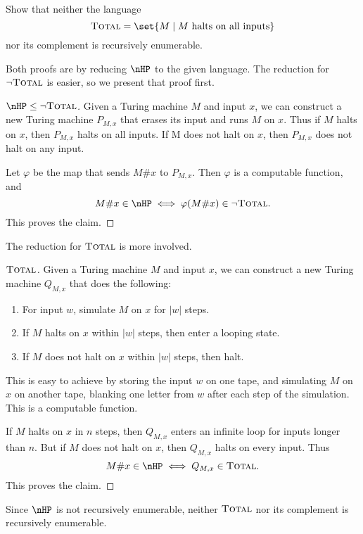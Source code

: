 \documentclass[12pt]{article}
\newcommand{\TOTAL}{\textsc{Total}}
\begin{document}
\begin{problem*}
    Show that neither the language \[
        \TOTAL = \set{M \mid M \text{ halts on all inputs}}
    \] nor its complement is recursively enumerable.
\end{problem*}
\begin{solution}
    Both proofs are by reducing $\nHP$ to the given language.
    The reduction for $\neg \TOTAL$ is easier,
    so we present that proof first.
    \begin{proof}[$\nHP \le \neg \TOTAL$]
        Given a Turing machine $M$ and input $x$, we can construct a new
        Turing machine $P_{M, x}$ that erases its input and runs $M$ on $x$.
        Thus if $M$ halts on $x$, then $P_{M, x}$ halts on all inputs.
        If M does not halt on $x$, then $P_{M, x}$ does not halt on any input.

        Let $\varphi$ be the map that sends $M\#x$ to $P_{M, x}$.
        Then $\varphi$ is a computable function, and \[
            M\#x \in \nHP \iff \varphi(M\#x) \in \neg \TOTAL.
        \] This proves the claim.
    \end{proof}

    The reduction for $\TOTAL$ is more involved.
    \begin{proof}[$\TOTAL$]
        Given a Turing machine $M$ and input $x$, we can construct a new
        Turing machine $Q_{M, x}$ that does the following:
        \begin{enumerate}
            \item For input $w$, simulate $M$ on $x$ for $|w|$ steps.
            \item If $M$ halts on $x$ within $|w|$ steps, then enter a
                looping state.
            \item If $M$ does not halt on $x$ within $|w|$ steps, then halt.
        \end{enumerate}
        This is easy to achieve by storing the input $w$ on one tape, and
        simulating $M$ on $x$ on another tape, blanking one letter from
        $w$ after each step of the simulation.
        This is a computable function.

        If $M$ halts on $x$ in $n$ steps, then $Q_{M, x}$ enters an
        infinite loop for inputs longer than $n$.
        But if $M$ does not halt on $x$, then $Q_{M, x}$ halts on every input.
        Thus \[
            M\#x \in \nHP \iff Q_{M, x} \in \TOTAL.
        \] This proves the claim.
    \end{proof}
    Since $\nHP$ is not recursively enumerable, neither $\TOTAL$ nor its
    complement is recursively enumerable.
\end{solution}
\end{document}
